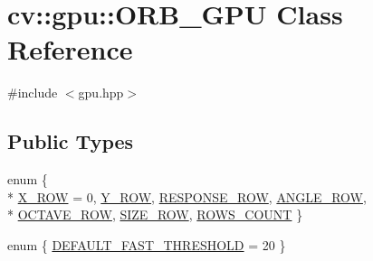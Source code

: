 \hypertarget{classcv_1_1gpu_1_1ORB__GPU}{\section{cv\-:\-:gpu\-:\-:O\-R\-B\-\_\-\-G\-P\-U Class Reference}
\label{classcv_1_1gpu_1_1ORB__GPU}
}


{\ttfamily \#include $<$gpu.\-hpp$>$}

\subsection*{Public Types}
\begin{DoxyCompactItemize}
\item 
enum \{ \\*
\hyperlink{classcv_1_1gpu_1_1ORB__GPU_a28fc54c8d944680e96c912b8b1676d11a5767e52ed0ad47c2520836685b9d4c87}{X\-\_\-\-R\-O\-W} = 0, 
\hyperlink{classcv_1_1gpu_1_1ORB__GPU_a28fc54c8d944680e96c912b8b1676d11a9d6a4b4b49a366b7b6f39c6ff1ac0ea2}{Y\-\_\-\-R\-O\-W}, 
\hyperlink{classcv_1_1gpu_1_1ORB__GPU_a28fc54c8d944680e96c912b8b1676d11a2596162c2cf8cabddb89cb71a779d9c3}{R\-E\-S\-P\-O\-N\-S\-E\-\_\-\-R\-O\-W}, 
\hyperlink{classcv_1_1gpu_1_1ORB__GPU_a28fc54c8d944680e96c912b8b1676d11a305d62b7a90a319886a897e3c83e193b}{A\-N\-G\-L\-E\-\_\-\-R\-O\-W}, 
\\*
\hyperlink{classcv_1_1gpu_1_1ORB__GPU_a28fc54c8d944680e96c912b8b1676d11a9d1d2f66bf10b01e230057d699772578}{O\-C\-T\-A\-V\-E\-\_\-\-R\-O\-W}, 
\hyperlink{classcv_1_1gpu_1_1ORB__GPU_a28fc54c8d944680e96c912b8b1676d11ab8d375a2903dc6c3d42952c2e25ccc3b}{S\-I\-Z\-E\-\_\-\-R\-O\-W}, 
\hyperlink{classcv_1_1gpu_1_1ORB__GPU_a28fc54c8d944680e96c912b8b1676d11ab6cc058f5a6e1b7e366acd60a4d5b21b}{R\-O\-W\-S\-\_\-\-C\-O\-U\-N\-T}
 \}
\item 
enum \{ \hyperlink{classcv_1_1gpu_1_1ORB__GPU_a0a2c976e847f9cab8f8c0b1ae6ae93e7a0c68b74ed44e64fbee00c13a0c61861e}{D\-E\-F\-A\-U\-L\-T\-\_\-\-F\-A\-S\-T\-\_\-\-T\-H\-R\-E\-S\-H\-O\-L\-D} = 20
 \}
\end{DoxyCompactItemize}

